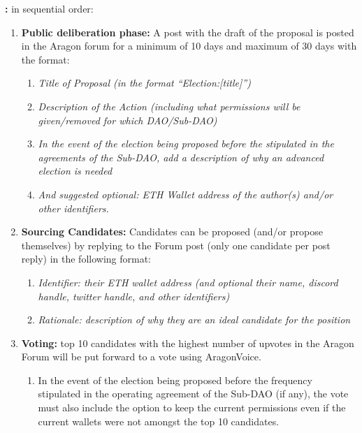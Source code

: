 \begin{enumerate}
\begin{enumerate}
		\textbf{:} in sequential order:
		\begin{enumerate}
			\item \textbf{Public deliberation phase:} A post with the draft of the proposal is posted
			in the Aragon forum for a minimum of 10 days and maximum of 30 days with the format:
			\begin{enumerate}
				\item \textit{Title of Proposal (in the format “Election:[title]”)}
				\item \textit{Description of the Action (including what permissions will be
				given/removed for which \ac{DAO}/Sub-\ac{DAO})}
				\item \textit{In the event of the election being proposed before the stipulated in
				the agreements of the Sub-\ac{DAO}, add a description of why an
				advanced election is needed}
				\item \textit{And suggested optional: ETH Wallet address of the author(s)
				and/or other identifiers.}
			\end{enumerate}

			\item \textbf{Sourcing Candidates:} Candidates can be proposed (and/or propose themselves) by replying to the Forum post (only one candidate per post reply) in the following format:
			\begin{enumerate}
				\item \textit{Identifier: their ETH wallet address (and optional their name, discord handle, twitter handle, and other identifiers)}
				\item \textit{Rationale: description of why they are an ideal candidate for the position}
			\end{enumerate}

			\item \textbf{Voting:} top 10 candidates with the highest number of upvotes in the Aragon Forum will be put forward to a vote using \gls{AragonVoice}.
			\begin{enumerate}
				\item In the event of the election being proposed before the frequency stipulated in the operating agreement of the Sub-\ac{DAO} (if any), the vote must also include the option to keep the current permissions even if the current wallets were not amongst the top 10 candidates.
			\end{enumerate}


\end{enumerate}
\end{enumerate}
\end{enumerate}

